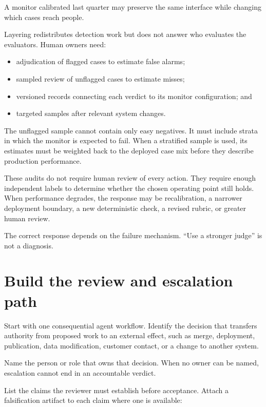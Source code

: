 A monitor calibrated last quarter may preserve the same interface while changing which cases reach people.

Layering redistributes detection work but does not answer who evaluates the evaluators. Human owners need:

\begin{itemize}
\tightlist
\item
  adjudication of flagged cases to estimate false alarms;
\item
  sampled review of unflagged cases to estimate misses;
\item
  versioned records connecting each verdict to its monitor configuration; and
\item
  targeted samples after relevant system changes.
\end{itemize}

The unflagged sample cannot contain only easy negatives. It must include strata in which the monitor is expected to fail. When a stratified sample is used, its estimates must be weighted back to the deployed case mix before they describe production performance.

These audits do not require human review of every action. They require enough independent labels to determine whether the chosen operating point still holds. When performance degrades, the response may be recalibration, a narrower deployment boundary, a new deterministic check, a revised rubric, or greater human review.

The correct response depends on the failure mechanism. ``Use a stronger judge'' is not a diagnosis.

\section{Build the review and escalation path}\label{build-the-review-and-escalation-path}

Start with one consequential agent workflow. Identify the decision that transfers authority from proposed work to an external effect, such as merge, deployment, publication, data modification, customer contact, or a change to another system.

Name the person or role that owns that decision. When no owner can be named, escalation cannot end in an accountable verdict.

List the claims the reviewer must establish before acceptance. Attach a falsification artifact to each claim where one is available:

